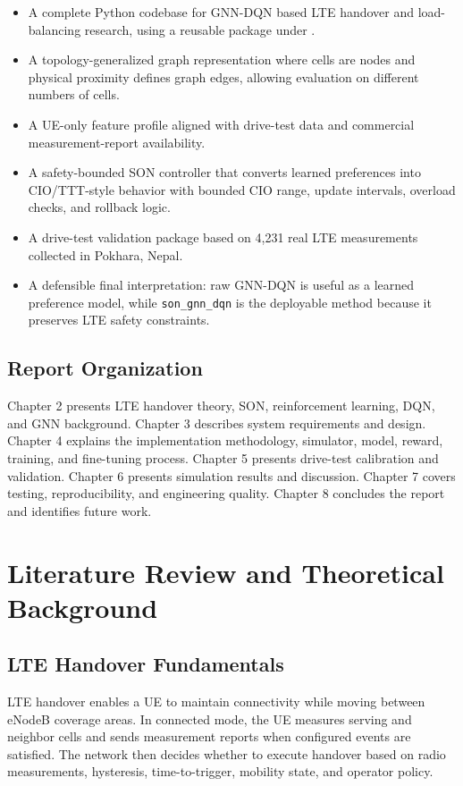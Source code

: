 \documentclass[12pt,a4paper]{report}
\newcommand{\method}{\texttt{son\_gnn\_dqn}}
\begin{document}
\begin{itemize}
    \item A complete Python codebase for GNN-DQN based LTE handover and load-balancing research, using a reusable package under .
    \item A topology-generalized graph representation where cells are nodes and physical proximity defines graph edges, allowing evaluation on different numbers of cells.
    \item A UE-only feature profile aligned with drive-test data and commercial measurement-report availability.
    \item A safety-bounded SON controller that converts learned preferences into CIO/TTT-style behavior with bounded CIO range, update intervals, overload checks, and rollback logic.
    \item A drive-test validation package based on 4,231 real LTE measurements collected in Pokhara, Nepal.
    \item A defensible final interpretation: raw GNN-DQN is useful as a learned preference model, while \method{} is the deployable method because it preserves LTE safety constraints.
\end{itemize}

\section{Report Organization}
Chapter 2 presents LTE handover theory, SON, reinforcement learning, DQN, and GNN background. Chapter 3 describes system requirements and design. Chapter 4 explains the implementation methodology, simulator, model, reward, training, and fine-tuning process. Chapter 5 presents drive-test calibration and validation. Chapter 6 presents simulation results and discussion. Chapter 7 covers testing, reproducibility, and engineering quality. Chapter 8 concludes the report and identifies future work.

\chapter{Literature Review and Theoretical Background}

\section{LTE Handover Fundamentals}
LTE handover enables a UE to maintain connectivity while moving between eNodeB coverage areas. In connected mode, the UE measures serving and neighbor cells and sends measurement reports when configured events are satisfied. The network then decides whether to execute handover based on radio measurements, hysteresis, time-to-trigger, mobility state, and operator policy.
\end{document}
